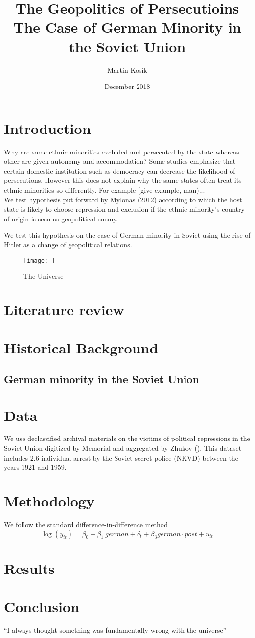 \documentclass[12pt]{article}
\title{The Geopolitics of Persecutioins \\
  \large The Case of German Minority in the Soviet Union}
\author{Martin Kosík}
\date{December 2018}
\begin{document}
\maketitle


\section{Introduction}
Why are some ethnic minorities excluded and persecuted by the state whereas other are given autonomy and accommodation? Some studies emphasize that certain domestic institution such as democracy can decrease the likelihood of persecutions. However this does not explain why the same states often treat its ethnic minorities so differently.  For example (give example, man)...\\
We test hypothesis put forward by Mylonas (2012) according to which the host state is likely to choose repression and exclusion if the ethnic minority's country of origin is seen as geopolitical enemy. 

We test this hypothesis on the case of German minority in Soviet using the rise of Hitler as a change of geopolitical relations. 


\begin{figure}[h!]
\centering
\texttt{[image: ]}
\caption{The Universe}
\label{fig:universe}
\end{figure}
\section{Literature review}

\section{Historical Background}
\subsection{German minority in the Soviet Union}
\section{Data}
We use declassified archival materials on the victims of political repressions in the Soviet Union digitized by Memorial and aggregated by Zhukov (). This dataset includes 2.6 individual arrest by the Soviet secret police (NKVD) between  the years 1921 and 1959.
\section{Methodology}
We follow the standard difference-in-difference method
$$ \log\left(y_{it}\right) = \beta_0 + \beta_1 \: german + \delta_t + \beta_3 german \cdot post + u_{it} $$

\section{Results}

\section{Conclusion}
``I always thought something was fundamentally wrong with the universe'' \citep{adams1995hitchhiker}





\end{document}
